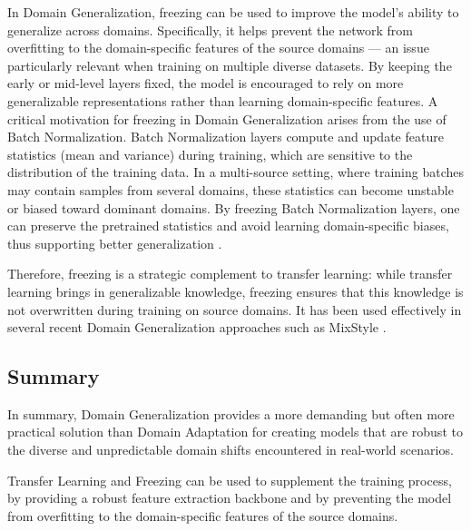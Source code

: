 In Domain Generalization, freezing can be used to improve the model's ability to generalize across domains. Specifically, it helps prevent the network from overfitting to the domain-specific features of the source domains — an issue particularly relevant when training on multiple diverse datasets. By keeping the early or mid-level layers fixed, the model is encouraged to rely on more generalizable representations rather than learning domain-specific features. A critical motivation for freezing in Domain Generalization arises from the use of Batch Normalization. Batch Normalization layers compute and update feature statistics (mean and variance) during training, which are sensitive to the distribution of the training data. In a multi-source setting, where training batches may contain samples from several domains, these statistics can become unstable or biased toward dominant domains. By freezing Batch Normalization layers, one can preserve the pretrained statistics and avoid learning domain-specific biases, thus supporting better generalization \citep{Goodfellow-et-al-2016,zhouMixStyleNeuralNetworks2023}.

Therefore, freezing is a strategic complement to transfer learning: while transfer learning brings in generalizable knowledge, freezing ensures that this knowledge is not overwritten during training on source domains. It has been used effectively in several recent Domain Generalization approaches such as MixStyle \citep{zhouMixStyleNeuralNetworks2023}.
\subsection*{Summary}
In summary, Domain Generalization provides a more demanding but often more practical solution than Domain Adaptation for creating models that are robust to the diverse and unpredictable domain shifts encountered in real-world scenarios.

Transfer Learning and Freezing can be used to supplement the training process, by providing a robust feature extraction backbone and by preventing the model from overfitting to the domain-specific features of the source domains.
